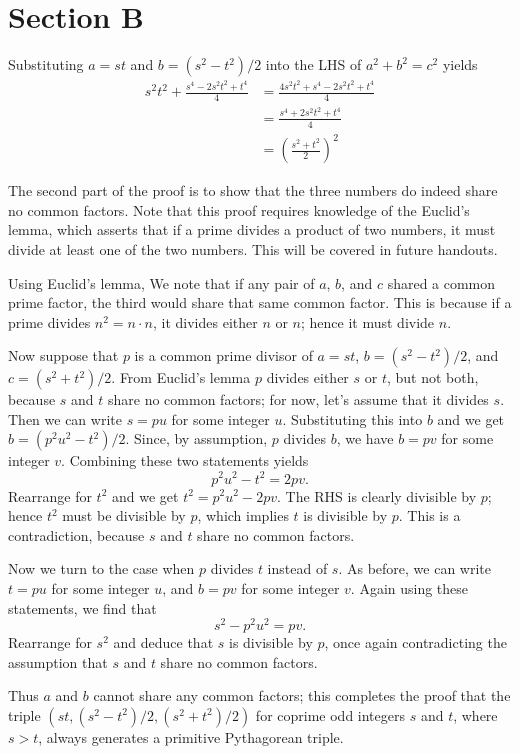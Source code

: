 \section*{Section B}
\sol
Substituting \(a=st\) and
\(b=(s^2-t^2)/2\)
into the LHS of \(a^2+b^2=c^2\)
yields
\[
\begin{split}
s^2t^2+\frac{s^4-2s^2t^2+t^4}{4}&=
\frac{4s^2t^2+s^4-2s^2t^2+t^4}{4}\\
&=\frac{s^4+2s^2t^2+t^4}{4}\\
&=\left(\frac{s^2+t^2}{2}\right)^2
\end{split}
\]

The second part of the proof is
to show that the three numbers do
indeed share no common factors.
Note that this proof requires knowledge
of the Euclid's lemma, which asserts
that if a prime divides a product of
two numbers, it must divide at least one
of the two numbers. This will be covered
in future handouts.

Using Euclid's lemma, We
note that if any pair of \(a\), \(b\),
and \(c\) shared a common prime factor, 
the third would share that same common factor.
This is because if a prime divides \(n^2=n\cdot n\), it
divides either \(n\) or \(n\); hence it must divide \(n\).

Now suppose that \(p\) is a common prime
divisor of \(a=st\), \(b=(s^2-t^2)/2\), and \(c=(s^2+t^2)/2\).
From Euclid's lemma \(p\) divides either \(s\) or \(t\), but not both,
because \(s\) and \(t\) share no common factors; for now,
let's assume that it divides \(s\). Then we can write \(s=pu\)
for some integer \(u\). Substituting this into \(b\) and we get
\(b=(p^2u^2-t^2)/2\). Since, by assumption, \(p\) divides \(b\),
we have \(b=pv\) for some integer \(v\). Combining these two statements yields
\[
p^2u^2-t^2=2pv.
\]
Rearrange for \(t^2\) and we get \(t^2=p^2u^2-2pv\). The RHS is clearly
divisible by \(p\); hence \(t^2\) must be divisible by \(p\), which
implies \(t\) is divisible by \(p\). This is a contradiction, because
\(s\) and \(t\) share no common factors.

Now we turn to the case when \(p\) divides \(t\) instead of \(s\). As
before, we can write \(t=pu\) for some integer \(u\), and \(b=pv\)
for some integer \(v\). Again using these statements, we find that
\[
s^2-p^2u^2=pv.
\]
Rearrange for \(s^2\) and deduce that \(s\) is divisible by \(p\), once
again contradicting the assumption that \(s\) and \(t\) share no common factors.

Thus \(a\) and \(b\) cannot share any common factors; this completes
the proof that the triple \((st, (s^2-t^2)/2, (s^2+t^2)/2)\) for
coprime odd integers \(s\) and \(t\), where \(s>t\), always generates
a primitive Pythagorean triple.

